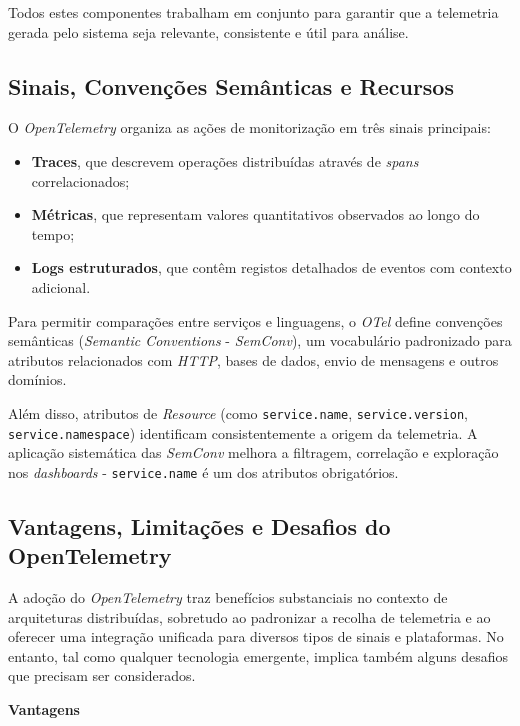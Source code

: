 Todos estes componentes trabalham em conjunto para garantir que a telemetria gerada pelo sistema seja relevante, consistente e útil para análise.

\subsection{Sinais, Convenções Semânticas e Recursos}

O \textit{OpenTelemetry} organiza as ações de monitorização em três sinais principais:

\begin{itemize}
    \item \textbf{Traces}, que descrevem operações distribuídas através de \textit{spans} correlacionados;
    \item \textbf{Métricas}, que representam valores quantitativos observados ao longo do tempo;
    \item \textbf{Logs estruturados}, que contêm registos detalhados de eventos com contexto adicional.
\end{itemize}

Para permitir comparações entre serviços e linguagens, o \textit{OTel} define convenções semânticas (\textit{Semantic Conventions} - \textit{SemConv}), um vocabulário padronizado para atributos relacionados com \textit{HTTP}, bases de dados, envio de mensagens e outros domínios. 

Além disso, atributos de \textit{Resource} (como \texttt{service.name}, \texttt{service.version}, \texttt{service.namespace}) identificam consistentemente a origem da telemetria. A aplicação sistemática das \textit{SemConv} melhora a filtragem, correlação e exploração nos \textit{dashboards} - \texttt{service.name} é um dos atributos obrigatórios.


\subsection{Vantagens, Limitações e Desafios do OpenTelemetry}

A adoção do \textit{OpenTelemetry} traz benefícios substanciais no contexto de arquiteturas distribuídas, sobretudo ao padronizar a recolha de telemetria e ao oferecer uma integração unificada para diversos tipos de sinais e plataformas. No entanto, tal como qualquer tecnologia emergente, implica também alguns desafios que precisam ser considerados.

\textbf{Vantagens}

